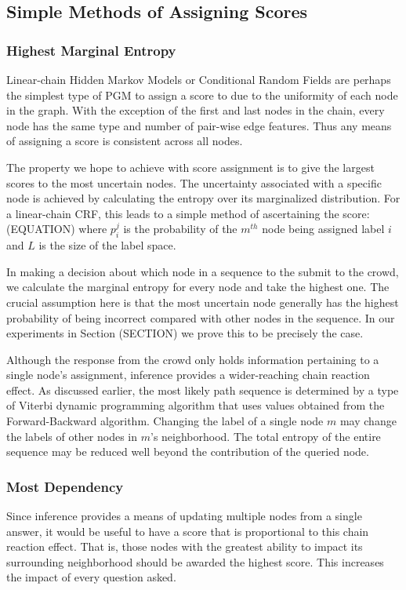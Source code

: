 \subsection{Simple Methods of Assigning Scores}
\subsubsection{Highest Marginal Entropy}
Linear-chain Hidden Markov Models or Conditional Random Fields are perhaps the simplest type of PGM to assign a score to due to the uniformity of each node in the graph.  With the exception of the first and last nodes in the chain, every node has the same type and number of pair-wise edge features.  Thus any means of assigning a score is consistent across all nodes.

The property we hope to achieve with score assignment is to give the largest scores to the most uncertain nodes.  The uncertainty associated with a specific node is achieved by calculating the entropy over its marginalized distribution.  For a linear-chain CRF, this leads to a simple method of ascertaining the score:
(EQUATION)
where $p_{i}^{j}$ is the probability of the $m^{th}$ node being assigned label $i$ and $L$ is the size of the label space.

In making a decision about which node in a sequence to the submit to the crowd, we calculate the marginal entropy for every node and take the highest one.  The crucial assumption here is that the most uncertain node generally has the highest probability of being incorrect compared with other nodes in the sequence.  In our experiments in Section (SECTION) we prove this to be precisely the case.  

Although the response from the crowd only holds information pertaining to a single node's assignment, inference provides a wider-reaching chain reaction effect.  As discussed earlier, the most likely path sequence is determined by a type of Viterbi dynamic programming algorithm that uses values obtained from the Forward-Backward algorithm.  Changing the label of a single node $m$ may change the labels of other nodes in $m$'s neighborhood.  The total entropy of the entire sequence may be reduced well beyond the contribution of the queried node.

\subsubsection{Most Dependency}
Since inference provides a means of updating multiple nodes from a single answer, it would be useful to have a score that is proportional to this chain reaction effect.  That is, those nodes with the greatest ability to impact its surrounding neighborhood should be awarded the highest score.  This increases the impact of every question asked. 

